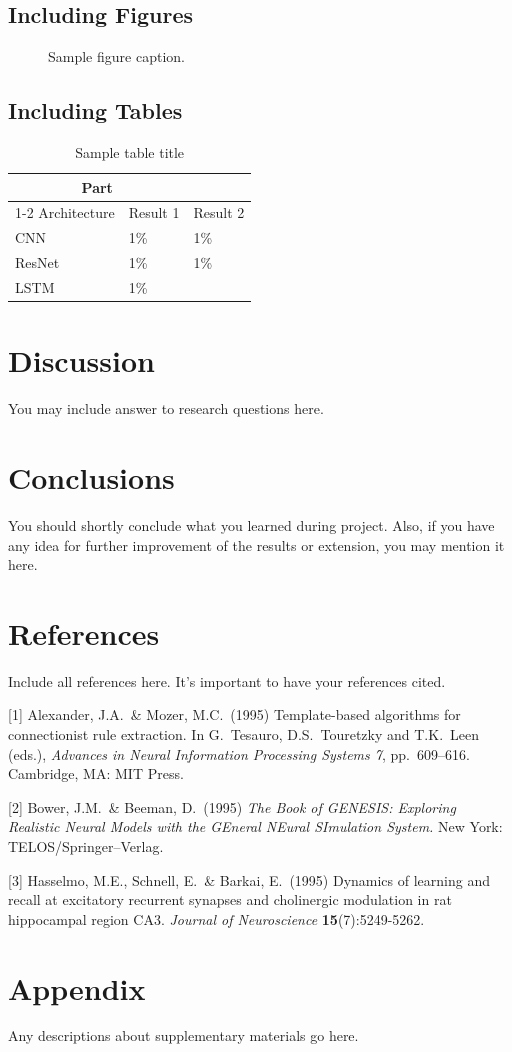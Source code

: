 \documentclass{article}
\begin{document}
\subsection{Including Figures}


\begin{figure}
  \centering
  \fbox{\rule[-.5cm]{0cm}{4cm} \rule[-.5cm]{4cm}{0cm}}
  \caption{Sample figure caption.}
\end{figure}



\subsection{Including Tables}

\begin{table}
  \caption{Sample table title}
  \label{sample-table}
  \centering
  \begin{tabular}{lll}
    \toprule
    \multicolumn{2}{c}{Part}                   \\
    \cmidrule(r){1-2}
    Architecture     & Result 1     & Result 2 \\
    \midrule
    CNN & 1\%  &1\%   \\
    ResNet     &1\% &1\%      \\
    LSTM     &1\%       &   \\
    \bottomrule
  \end{tabular}
\end{table}

\section{Discussion}
You may include answer to research questions here.


\section{Conclusions}
You should shortly conclude what you learned during project. Also, if you have any idea for further improvement of the results or extension, you may mention it here.




\section*{References}
Include all references here. It’s important to have your references cited.
\medskip
{
\small


[1] Alexander, J.A.\ \& Mozer, M.C.\ (1995) Template-based algorithms for
connectionist rule extraction. In G.\ Tesauro, D.S.\ Touretzky and T.K.\ Leen
(eds.), {\it Advances in Neural Information Processing Systems 7},
pp.\ 609--616. Cambridge, MA: MIT Press.


[2] Bower, J.M.\ \& Beeman, D.\ (1995) {\it The Book of GENESIS: Exploring
  Realistic Neural Models with the GEneral NEural SImulation System.}  New York:
TELOS/Springer--Verlag.


[3] Hasselmo, M.E., Schnell, E.\ \& Barkai, E.\ (1995) Dynamics of learning and
recall at excitatory recurrent synapses and cholinergic modulation in rat
hippocampal region CA3. {\it Journal of Neuroscience} {\bf 15}(7):5249-5262.
}

\section*{Appendix}
Any descriptions about supplementary materials go here.
\end{document}
